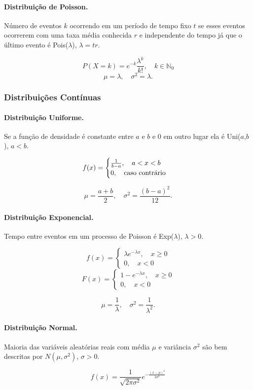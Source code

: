 \paragraph{Distribuição de Poisson.} Número de eventos $k$ ocorrendo em um período de tempo fixo $t$ se esses eventos ocorrerem com uma taxa média conhecida $r$ e independente do tempo já que o último evento é Pois($\lambda$), $\lambda = tr$.

$$P(X = k) = e^{-k}\frac{\lambda^k}{k!}, \quad k \in \mathbb{N}_0$$
$$\mu = \lambda, \quad \sigma^2 = \lambda.$$

\subsubsection{Distribuições Contínuas}
\paragraph{Distribuição Uniforme.} Se a função de densidade é constante entre $a$ e $b$ e 0 em outro lugar ela é Uni($a$,$b$), $a < b$.

$$
f(x) = \begin{cases}
			\frac{1}{b-a},\quad a < x < b \\
			0, \quad \textnormal{caso contrário}
		\end{cases}
$$

$$\mu = \frac{a+b}{2},\quad \sigma^2 = \frac{(b-a)^2}{12}.$$

\paragraph{Distribuição Exponencial.} Tempo entre eventos em um processo de Poisson é Exp($\lambda$), $\lambda > 0$.

$$
f(x) = \begin{cases}
			\lambda e^{-\lambda x},\quad x \ge 0 \\
			0,\quad x < 0
		\end{cases}
$$
$$
F(x) = \begin{cases}
			1 - e^{-\lambda	x},\quad x \ge 0 \\
			0,\quad x < 0
		\end{cases}
$$

$$\mu = \frac{1}{\lambda},\quad \sigma^2 = \frac{1}{\lambda^2}.$$

\paragraph{Distribuição Normal.} Maioria das variáveis aleatórias reais com média $\mu$ e variância $\sigma^2$ são bem descritas por $N(\mu,\sigma^2)$, $\sigma > 0$.

$$f(x) = \frac{1}{\sqrt{2\pi \sigma^2}}e^{-\frac{(x-\mu)^2}{2\sigma^2}}$$